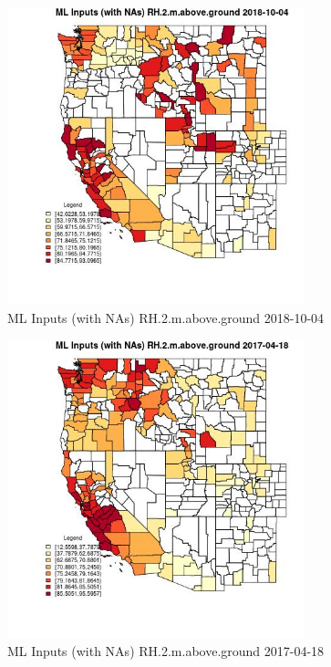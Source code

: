 \begin{figure} 
\centering  
\includegraphics[width=0.77\textwidth]{Code_Outputs/Report_ML_input_PM25_Step4_part_f_de_duplicated_aveswNAs_CountyRH2mabovegroundMean2018-10-04.jpg} 
\caption{\label{fig:Report_ML_input_PM25_Step4_part_f_de_duplicated_aveswNAsCountyRH2mabovegroundMean2018-10-04}ML Inputs (with NAs) RH.2.m.above.ground 2018-10-04} 
\end{figure} 
 

\begin{figure} 
\centering  
\includegraphics[width=0.77\textwidth]{Code_Outputs/Report_ML_input_PM25_Step4_part_f_de_duplicated_aveswNAs_CountyRH2mabovegroundMean2017-04-18.jpg} 
\caption{\label{fig:Report_ML_input_PM25_Step4_part_f_de_duplicated_aveswNAsCountyRH2mabovegroundMean2017-04-18}ML Inputs (with NAs) RH.2.m.above.ground 2017-04-18} 
\end{figure} 
 

